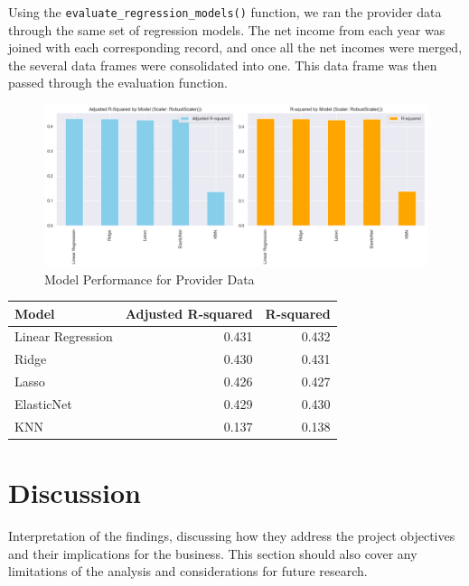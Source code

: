 \documentclass{article}
\theoremstyle{mytheoremstyle}
\theoremstyle{mytheoremstyle}
\theoremstyle{myproblemstyle}
\begin{document}
Using the \texttt{evaluate\_regression\_models()} function, we ran the provider data through the same set of regression models. The net income from each year was joined with each corresponding record, and once all the net incomes were merged, the several data frames were consolidated into one. This data frame was then passed through the evaluation function. 

\begin{figure}[htbp]
\centering
\includegraphics[width=\linewidth]{Images/evalRegModelProviders.png}
\caption{Model Performance for Provider Data}
\label{fig:Robust Scaler Results}
\end{figure}

\begin{table}[ht]
\centering
\begin{tabular}{@{}lrr@{}}
\toprule
Model            & \multicolumn{1}{c}{Adjusted R-squared} & \multicolumn{1}{c}{R-squared} \\ 
\midrule
Linear Regression & 0.431 & 0.432 \\
Ridge             & 0.430 & 0.431 \\
Lasso             & 0.426 & 0.427 \\
ElasticNet        & 0.429 & 0.430 \\
KNN               & 0.137 & 0.138 \\
\bottomrule
\end{tabular}
\label{tab:model_performance robust}
\end{table}


\pagebreak
\section{Discussion}
Interpretation of the findings, discussing how they address the project objectives and their implications for the business. This section should also cover any limitations of the analysis and considerations for future research.
\end{document}
